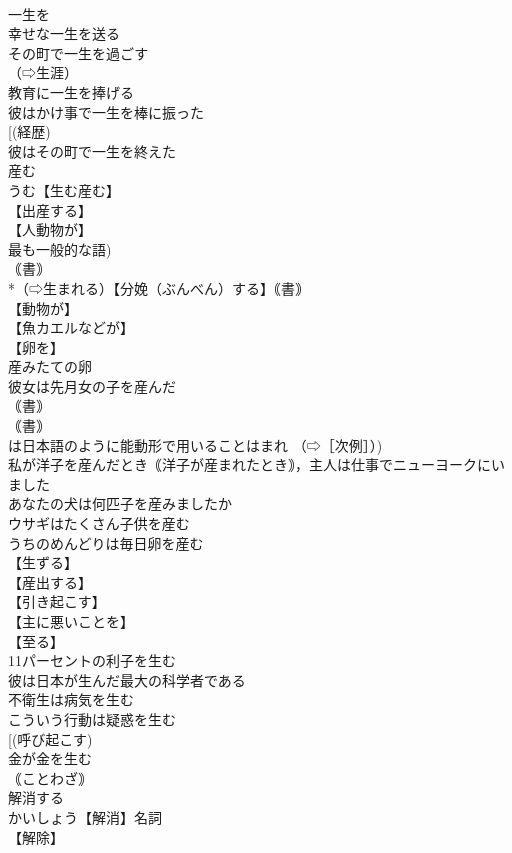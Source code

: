 \documentclass[8pt]{extreport}
\begin{document}
\begin{CJK}{UTF8}{min}
\\	一生を
\\	幸せな一生を送る
\\	その町で一生を過ごす
\\	（⇨生涯）
\\	教育に一生を捧げる
\\	彼はかけ事で一生を棒に振った
\\	[(経歴) 
\\	彼はその町で一生を終えた
\\	産む		
\\	うむ【生む産む】
\\	【出産する】
\\	【人動物が】
\\	最も一般的な語) 
\\	｟書｠ 
\\	*（⇨生まれる）【分娩（ぶんべん）する】｟書｠
\\	【動物が】
\\	【魚カエルなどが】
\\	【卵を】
\\	産みたての卵
\\	彼女は先月女の子を産んだ
\\	｟書｠ 
\\	｟書｠ 
\\	は日本語のように能動形で用いることはまれ （⇨［次例］）)
\\	私が洋子を産んだとき｟洋子が産まれたとき｠，主人は仕事でニューヨークにいました
\\	あなたの犬は何匹子を産みましたか
\\	ウサギはたくさん子供を産む
\\	うちのめんどりは毎日卵を産む
\\	【生ずる】
\\	【産出する】
\\	【引き起こす】
\\	【主に悪いことを】
\\	【至る】
\\	11パーセントの利子を生む
\\	彼は日本が生んだ最大の科学者である
\\	不衛生は病気を生む
\\	こういう行動は疑惑を生む
\\	[(呼び起こす) 
\\	金が金を生む
\\	｟ことわざ｠
\\	解消する		
\\	かいしょう【解消】名詞
\\	【解除】

\end{CJK}
\end{document}
